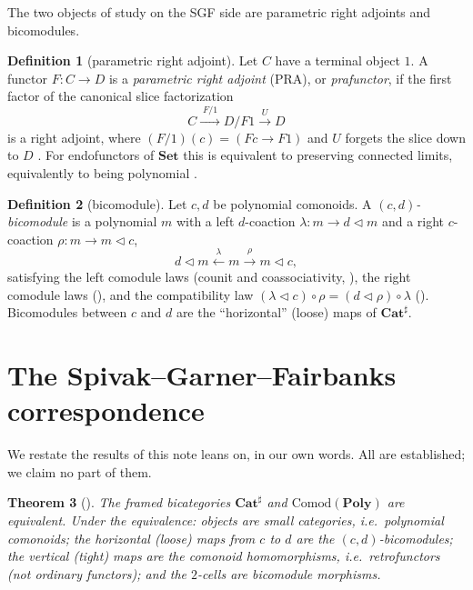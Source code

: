 \documentclass[11pt]{amsart}
\theoremstyle{plain}
\newtheorem{theorem}{Theorem}[section]
\theoremstyle{definition}
\newtheorem{definition}[theorem]{Definition}
\newcommand{\Poly}{\mathbf{Poly}}
\newcommand{\Cathash}{\mathbf{Cat}^{\sharp}}
\newcommand{\Set}{\mathbf{Set}}
\newcommand{\Comod}{\mathrm{Comod}}
\renewcommand{\lhd}{\triangleleft}
\begin{document}
The two objects of study on the SGF side are parametric right adjoints and bicomodules.

\begin{definition}[parametric right adjoint]\label{def:pra}
Let $C$ have a terminal object $1$. A functor $F\colon C\to D$ is a \emph{parametric right
adjoint} (PRA), or \emph{prafunctor}, if the first factor of the canonical slice
factorization
\[
C \xrightarrow{\;F/1\;} D/F1 \xrightarrow{\;U\;} D
\]
is a right adjoint, where $(F/1)(c)=(Fc\to F1)$ and $U$ forgets the slice down to $D$
\cite[Def.~3.5, eq.~(21)]{SGF}. For endofunctors of $\Set$ this is equivalent to preserving
connected limits, equivalently to being polynomial \cite[Prop.~2.5]{SGF}.
\end{definition}

\begin{definition}[bicomodule]\label{def:bicomod}
Let $c,d$ be polynomial comonoids. A \emph{$(c,d)$-bicomodule} \cite[Def.~4.2]{SGF} is a
polynomial $m$ with a left $d$-coaction $\lambda\colon m\to d\lhd m$ and a right
$c$-coaction $\rho\colon m\to m\lhd c$,
\[
d\lhd m \xleftarrow{\;\lambda\;} m \xrightarrow{\;\rho\;} m\lhd c,
\]
satisfying the left comodule laws (counit and coassociativity, \cite[(34)]{SGF}), the right
comodule laws (\cite[(35)]{SGF}), and the compatibility law
$(\lambda\lhd c)\circ\rho=(d\lhd\rho)\circ\lambda$ (\cite[(36)]{SGF}). Bicomodules between
$c$ and $d$ are the ``horizontal'' (loose) maps of $\Cathash$.
\end{definition}

\section{The Spivak--Garner--Fairbanks correspondence}\label{sec:corr}

We restate the results of \cite{SGF} this note leans on, in our own words. All are
established; we claim no part of them.

\begin{theorem}[{\cite[Thm.~4.28]{SGF}}]\label{thm:sgf-main}
The framed bicategories $\Cathash$ and $\Comod(\Poly)$ are equivalent. Under the
equivalence: objects are small categories, i.e.\ polynomial comonoids; the horizontal
(loose) maps from $c$ to $d$ are the $(c,d)$-bicomodules; the vertical (tight) maps are the
comonoid homomorphisms, i.e.\ retrofunctors (\emph{not} ordinary functors); and the
$2$-cells are bicomodule morphisms.
\end{theorem}
\end{document}
